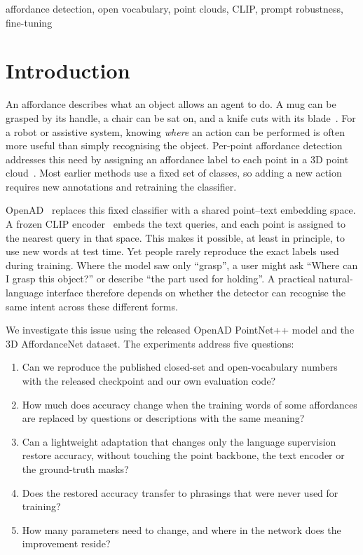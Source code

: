 \documentclass[conference]{IEEEtran}
\begin{document}
\begin{IEEEkeywords}
affordance detection, open vocabulary, point clouds, CLIP, prompt robustness, fine-tuning
\end{IEEEkeywords}

\section{Introduction}
\label{sec:intro}

An affordance describes what an object allows an agent to do. A mug can be grasped by its handle, a chair can be sat on, and a knife cuts with its blade~\cite{gibson1979}. For a robot or assistive system, knowing \emph{where} an action can be performed is often more useful than simply recognising the object. Per-point affordance detection addresses this need by assigning an affordance label to each point in a 3D point cloud~\cite{affordancenet}. Most earlier methods use a fixed set of classes, so adding a new action requires new annotations and retraining the classifier.

OpenAD~\cite{openad} replaces this fixed classifier with a shared point--text embedding space. A frozen CLIP encoder~\cite{clip} embeds the text queries, and each point is assigned to the nearest query in that space. This makes it possible, at least in principle, to use new words at test time. Yet people rarely reproduce the exact labels used during training. Where the model saw only ``grasp'', a user might ask ``Where can I grasp this object?'' or describe ``the part used for holding''. A practical natural-language interface therefore depends on whether the detector can recognise the same intent across these different forms.

We investigate this issue using the released OpenAD PointNet++ model and the 3D AffordanceNet dataset. The experiments address five questions:
\begin{enumerate}
\item Can we reproduce the published closed-set and open-vocabulary numbers with the released checkpoint and our own evaluation code?
\item How much does accuracy change when the training words of some affordances are replaced by questions or descriptions with the same meaning?
\item Can a lightweight adaptation that changes only the language supervision restore accuracy, without touching the point backbone, the text encoder or the ground-truth masks?
\item Does the restored accuracy transfer to phrasings that were never used for training?
\item How many parameters need to change, and where in the network does the improvement reside?
\end{enumerate}
\end{document}
